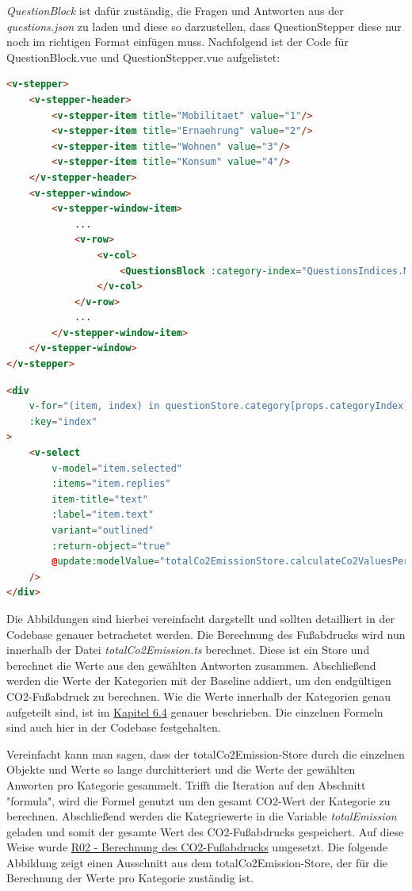 \textit{QuestionBlock} ist dafür zuständig, die Fragen und Antworten aus der \textit{questions.json} zu laden und diese so darzustellen, dass QuestionStepper diese nur noch im richtigen Format einfügen muss. Nachfolgend ist der Code für QuestionBlock.vue und QuestionStepper.vue aufgelistet:

\begin{lstlisting}[language={html}, caption={QuestionStepper.vue}]
<v-stepper>
    <v-stepper-header>
        <v-stepper-item title="Mobilitaet" value="1"/>
        <v-stepper-item title="Ernaehrung" value="2"/>
        <v-stepper-item title="Wohnen" value="3"/>
        <v-stepper-item title="Konsum" value="4"/>
    </v-stepper-header>
    <v-stepper-window>
        <v-stepper-window-item>
            ...
            <v-row>
                <v-col>
                    <QuestionsBlock :category-index="QuestionsIndices.MOBILITY"/>
                </v-col>
            </v-row>
            ...
        </v-stepper-window-item>
    </v-stepper-window>
</v-stepper>
\end{lstlisting}

\newpage

\begin{lstlisting}[language={html}, caption={QuestionBlock.vue}]
<div
    v-for="(item, index) in questionStore.category[props.categoryIndex].questions"
    :key="index"
>
    <v-select
        v-model="item.selected"
        :items="item.replies"
        item-title="text"
        :label="item.text"
        variant="outlined"
        :return-object="true"
        @update:modelValue="totalCo2EmissionStore.calculateCo2ValuesPerCategory()"
    />
</div>
\end{lstlisting}

Die Abbildungen sind hierbei vereinfacht dargstellt und sollten detailliert in der Codebase genauer betrachetet werden. Die Berechnung des Fußabdrucks wird nun innerhalb der Datei \textit{totalCo2Emission.ts} berechnet. Diese ist ein Store und berechnet die Werte aus den gewählten Antworten zusammen. Abschließend werden die Werte der Kategorien mit der Baseline addiert, um den endgültigen CO2-Fußabdruck zu berechnen. Wie die Werte innerhalb der Kategorien genau aufgeteilt sind, ist im \hyperref[sec:anpassung-der-questions-json]{Kapitel 6.4} genauer beschrieben. Die einzelnen Formeln sind auch hier in der Codebase festgehalten.

Vereinfacht kann man sagen, dass der totalCo2Emission-Store durch die einzelnen Objekte und Werte so lange durchitteriert und die Werte der gewählten Anworten pro Kategorie gesammelt. Trifft die Iteration auf den Abschnitt "formula", wird die Formel genutzt um den gesamt CO2-Wert der Kategorie zu berechnen. Abschließend werden die Kategriewerte in die Variable \textit{totalEmission} geladen und somit der gesamte Wert des CO2-Fußabdrucks gespeichert. Auf diese Weise wurde \hyperref[sec:berechnung-des-co2abdrucks]{R02 - Berechnung des CO2-Fußabdrucks} umgesetzt. Die folgende Abbildung zeigt einen Ausschnitt aus dem totalCo2Emission-Store, der für die Berechnung der Werte pro Kategorie zuständig ist.

